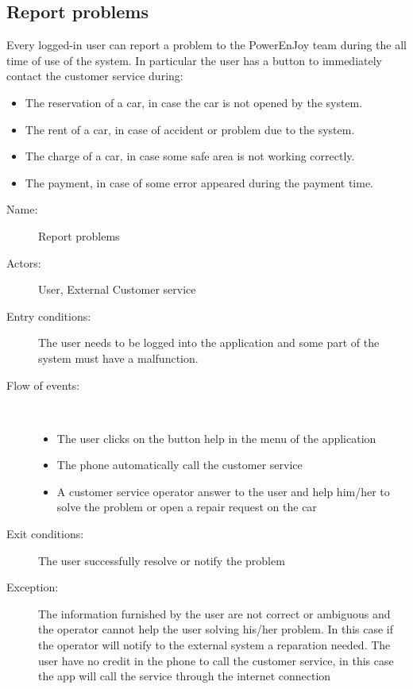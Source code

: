 \subsection{Report problems}
Every logged-in user can report a problem to the PowerEnJoy team during the all time of use of the system. In particular the user has a button to immediately contact the customer service during:
\begin{itemize}
	\item The reservation of a car, in case the car is not opened by the system.
	\item The rent of a car, in case of accident or problem due to the system.
	\item The charge of a car, in case some safe area is not working correctly.
	\item The payment, in case of some error appeared during the payment time.
\end{itemize}
\begin{description}
	\item[Name:] Report problems
	\item[Actors:] User, External Customer service
	\item[Entry conditions:] The user needs to be logged into the application and some part of the system must have a malfunction.
	\item[Flow of events:]  \ \\
		\begin{itemize}
			\item The user clicks on the button help in the menu of the application
			\item The phone automatically call the customer service 
			\item A customer service operator answer to the user and help him/her to solve the problem or open a repair request on the car
		\end{itemize}
	\item[Exit conditions:] The user successfully resolve or notify the problem
	\item [Exception:] The information furnished by the user are not correct or ambiguous and the operator cannot help the user solving his/her problem. In this case if the operator will notify to the external system a reparation needed. The user have no credit in the phone to call the customer service, in this case the app will call the service through the internet connection 
\end{description}
 \ \\
